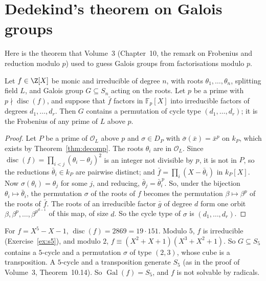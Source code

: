 \section{Dedekind's theorem on Galois groups}

Here is the theorem that Volume~3 (Chapter~10, the remark on Frobenius and reduction modulo $p$) used to guess Galois groups from factorisations modulo $p$.

\begin{theorem}[Dedekind]\label{thm:dedekindcycle}
Let $f\in\Z[X]$ be monic and irreducible of degree $n$, with roots $\theta_1,\dots,\theta_n$, splitting field $L$, and
Galois group $G\subseteq S_n$ acting on the roots. Let $p$ be a prime with $p\nmid\operatorname{disc}(f)$, and suppose that
$\bar f$ factors in $\mathbb F_p[X]$ into irreducible factors of degrees $d_1,\dots,d_r$. Then $G$ contains a permutation
of cycle type $(d_1,\dots,d_r)$; it is the Frobenius of any prime of $L$ above $p$.
\end{theorem}
\begin{proof}
Let $P$ be a prime of $\mathcal O_L$ above $p$ and $\sigma\in D_P$ with $\bar\sigma(\bar x)=\bar x^p$ on $k_P$, which
exists by Theorem~\ref{thm:decomp}. The roots $\theta_i$ are in $\mathcal O_L$. Since $\operatorname{disc}(f)=\prod_{i<j}
(\theta_i-\theta_j)^2$ is an integer not divisible by $p$, it is not in $P$, so the reductions $\bar\theta_i\in k_P$ are
pairwise distinct; and $\bar f=\prod_i(X-\bar\theta_i)$ in $k_P[X]$. Now $\sigma(\theta_i)=\theta_j$ for some $j$, and
reducing, $\bar\theta_j=\bar\theta_i^{\,p}$. So, under the bijection $\theta_i\mapsto\bar\theta_i$, the permutation
$\sigma$ of the roots of $f$ becomes the permutation $\beta\mapsto\beta^p$ of the roots of $\bar f$. The roots of an
irreducible factor $\bar g$ of degree $d$ form one orbit $\beta,\beta^p,\dots,\beta^{p^{d-1}}$ of this map, of size $d$.
So the cycle type of $\sigma$ is $(d_1,\dots,d_r)$.
\end{proof}

\begin{example}
For $f=X^5-X-1$, $\operatorname{disc}(f)=2869=19\cdot151$. Modulo $5$, $f$ is irreducible (Exercise~\ref{ex:s5}), and
modulo $2$, $f\equiv(X^2+X+1)(X^3+X^2+1)$. So $G\subseteq S_5$ contains a $5$-cycle and a permutation $\sigma$ of type
$(2,3)$, whose cube is a transposition. A $5$-cycle and a transposition generate $S_5$ (as in the proof of Volume~3,
Theorem~10.14). So $\operatorname{Gal}(f)=S_5$, and $f$ is not solvable by radicals.
\end{example}

